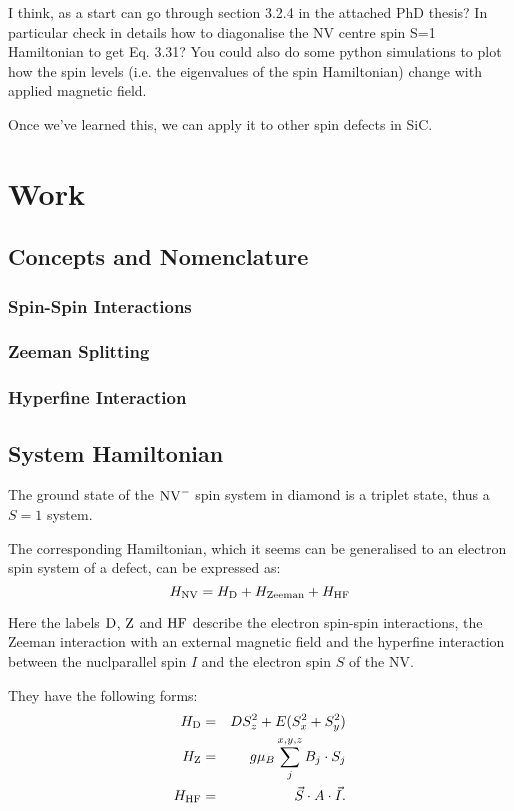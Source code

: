 I think, as a start can go through section 3.2.4 in the attached PhD thesis? In particular check in details how to diagonalise the NV centre spin S=1 Hamiltonian to get Eq. 3.31?
You could also do some python simulations to plot how the spin levels (i.e. the eigenvalues of the spin Hamiltonian) change with applied magnetic field.

Once we've learned this, we can apply it to other spin defects in SiC.

\section{Work}
\subsection{Concepts and Nomenclature}
\subsubsection{Spin-Spin Interactions}
\subsubsection{Zeeman Splitting}
\subsubsection{Hyperfine Interaction}
\subsection{System Hamiltonian}\label{system_hamiltonian}
The ground state of the $\ce{NV^-}$ spin system in diamond is a triplet state, thus a $S=1$ system. 

The corresponding Hamiltonian, which it seems can be generalised to an electron spin system of a defect, can be expressed as: 
\begin{equation}
    H_{\ce{NV}} = H_{\ce{D}} + H_{\ce{Zeeman}} + H_{\ce{HF}} 
    \label{eq:nv_hamil}
\end{equation}

Here the labels $\ce{D}$, $\ce{Z}$ and $\ce{HF}$ describe the electron spin-spin interactions, the Zeeman interaction with an external magnetic field and the hyperfine interaction between the nuclparallel spin $I$ and the electron spin $S$ of the NV. 

They have the following forms: 
\begin{eqnarray}
    H_{\ce{D}} &=& D S_z^2 + E(S_x^2 + S_y^2) \label{H_D} \\
    H_{\ce{Z}} &=& g \mu_B \sum_{j}^{x,y,z} B_j \cdot S_j \label{H_Z} \\
    H_{\ce{HF}} &=& \vec{S} \cdot A \cdot \vec{I}. \label{H_HF}
\end{eqnarray}

